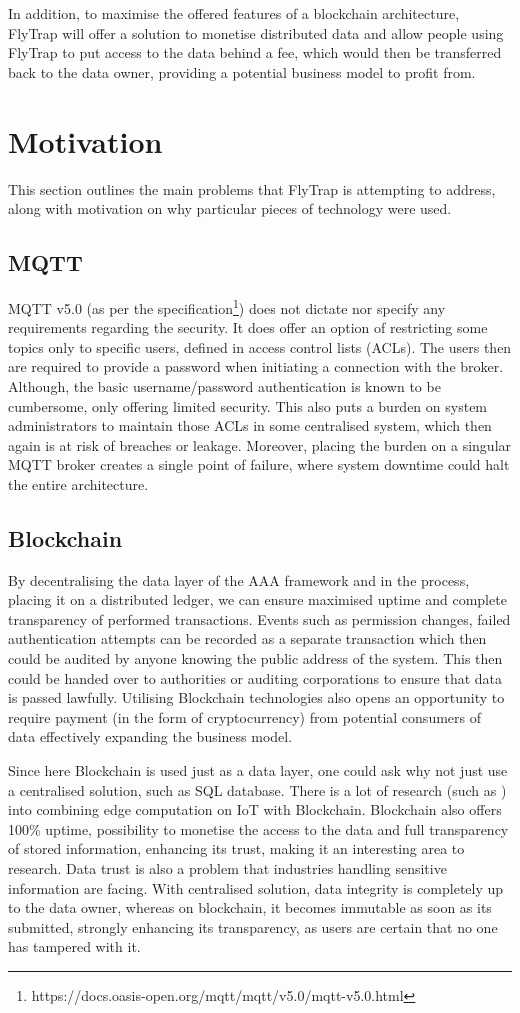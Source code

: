In addition, to maximise the offered features of a blockchain architecture, FlyTrap will offer a solution to monetise distributed data and allow people using FlyTrap to put access to the data behind a fee, which would then be transferred back to the data owner, providing a potential business model to profit from.

\section{Motivation}
This section outlines the main problems that FlyTrap is attempting to address, along with motivation on why particular pieces of technology were used.
\subsection{MQTT}
MQTT v5.0 (as per the specification\footnote{https://docs.oasis-open.org/mqtt/mqtt/v5.0/mqtt-v5.0.html}) does not dictate nor specify any requirements regarding the security. It does offer an option of restricting some topics only to specific users, defined in access control lists (ACLs). The users then are required to provide a password when initiating a connection with the broker. Although, the basic username/password authentication is known to be cumbersome, only offering limited security. This also puts a burden on system administrators to maintain those ACLs in some centralised system, which then again is at risk of breaches or leakage. Moreover, placing the burden on a singular MQTT broker creates a single point of failure, where system downtime could halt the entire architecture.
\subsection{Blockchain}
By decentralising the data layer of the AAA framework and in the process, placing it on a distributed ledger, we can ensure maximised uptime and complete transparency of performed transactions. Events such as permission changes, failed authentication attempts can be recorded as a separate transaction which then could be audited by anyone knowing the public address of the system. This then could be handed over to authorities or auditing corporations to ensure that data is passed lawfully. Utilising Blockchain technologies also opens an opportunity to require payment (in the form of cryptocurrency) from potential consumers of data effectively expanding the business model.

Since here Blockchain is used just as a data layer, one could ask why not just use a centralised solution, such as SQL database. There is a lot of research (such as \cite{fakhri2018secure, gilbert2003security}) into combining edge computation on IoT with Blockchain. Blockchain also offers 100\% uptime, possibility to monetise the access to the data and full transparency of stored information, enhancing its trust, making it an interesting area to research. Data trust is also a problem that industries handling sensitive information are facing. With centralised solution, data integrity is completely up to the data owner, whereas on blockchain, it becomes immutable as soon as its submitted, strongly enhancing its transparency, as users are certain that no one has tampered with it.
